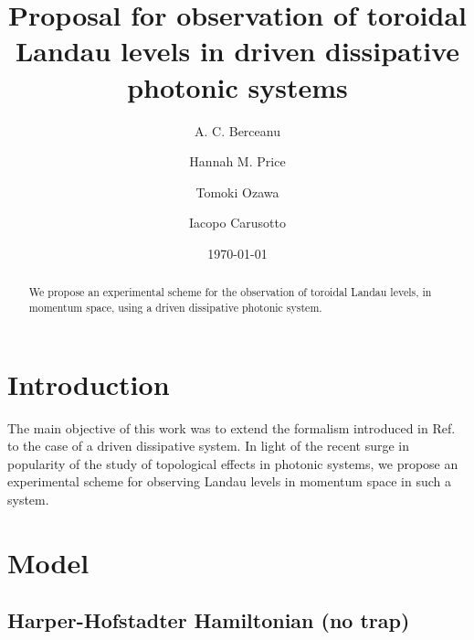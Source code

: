 \documentclass[twocolumn, 10pt, aps, superscriptaddress, floatfix, showpacs, prb, citeautoscript]{revtex4-1}
\newcommand{\co}[2]{#2}
\renewcommand{\paragraph}{\co}
\begin{document}
\title{Proposal for observation of toroidal Landau levels in driven dissipative photonic systems}


\author{A. C. Berceanu}
\author{Hannah M. Price}
\author{Tomoki Ozawa}
\author{Iacopo Carusotto}

\date{\today}

\begin{abstract}
  We propose an experimental scheme for the observation of toroidal
  Landau levels, in momentum space, using a driven dissipative
  photonic system.
\end{abstract}

\maketitle


\section{Introduction}

\paragraph{First paragraph.}
The main objective of this work was to extend the formalism introduced
in Ref.~ to the case of a driven
dissipative system. In light of the recent surge in popularity of the
study of topological effects in photonic systems, we propose an
experimental scheme for observing Landau levels in momentum space in
such a system.


\section{Model}
\label{sec:model}

\subsection{Harper-Hofstadter Hamiltonian (no trap)}
\label{sec:hh_notrap}
\end{document}

